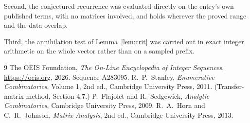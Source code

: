 \documentclass[11pt,a4paper]{article}
\theoremstyle{plain}
\theoremstyle{definition}
\begin{document}
Second, the conjectured recurrence was evaluated directly on the entry's own published terms,
with no matrices involved, and holds wherever the proved range and the data overlap.

Third, the annihilation test of Lemma~\ref{lem:crit} was carried out in exact integer
arithmetic on the whole vector rather than on a sampled prefix.

\begin{thebibliography}{9}
 The OEIS Foundation, \emph{The On-Line Encyclopedia of Integer
Sequences}, \url{https://oeis.org}, 2026. Sequence A283095.
 R.~P.~Stanley, \emph{Enumerative Combinatorics}, Volume 1, 2nd ed.,
Cambridge University Press, 2011. (Transfer-matrix method, Section 4.7.)
 P.~Flajolet and R.~Sedgewick, \emph{Analytic Combinatorics}, Cambridge
University Press, 2009.
 R.~A.~Horn and C.~R.~Johnson, \emph{Matrix Analysis}, 2nd ed., Cambridge
University Press, 2013.
\end{thebibliography}
\end{document}
